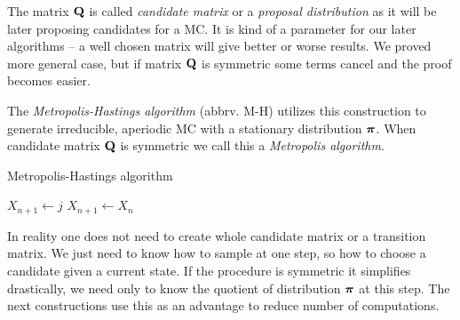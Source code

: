 	The matrix $\mathbf{Q}$ is called \textit{candidate matrix} or a \textit{proposal distribution} as it will be later proposing candidates for a MC. It is kind of a parameter for our later algorithms -- a well chosen matrix will give better or worse results. We proved more general case, but if matrix $\mathbf{Q}$ is symmetric some terms cancel and the proof becomes easier.
	
	The \textit{Metropolis-Hastings algorithm} (abbrv. M-H) utilizes this construction to generate irreducible, aperiodic MC with a stationary distribution $\boldsymbol{\pi}$. When candidate matrix $\mathbf{Q}$ is symmetric we call this a \textit{Metropolis algorithm}.
	\begin{algorithm}
		\caption{Metropolis-Hastings algorithm}\label{alg:metro-hast}
		\begin{algorithmic}[1]
				
					\State $X_{n+1} \gets j$
				\Else
					\State $X_{n+1} \gets X_n$
				\EndIf
			\EndFor
		\end{algorithmic}
	\end{algorithm}
	
	In reality one does not need to create whole candidate matrix or a transition matrix. We just need to know how to sample at one step, so how to choose a candidate given a current state. If the procedure is symmetric it simplifies drastically, we need only to know the quotient of distribution $\boldsymbol{\pi}$ at this step. The next constructions use this as an advantage to reduce number of computations.
	